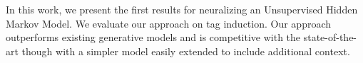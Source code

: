 In this work, we present the first results for neuralizing an Unsupervised Hidden Markov Model.  We evaluate our approach on tag induction.  Our approach outperforms existing generative models and is competitive with the state-of-the-art though with a simpler model easily extended to include additional context.
